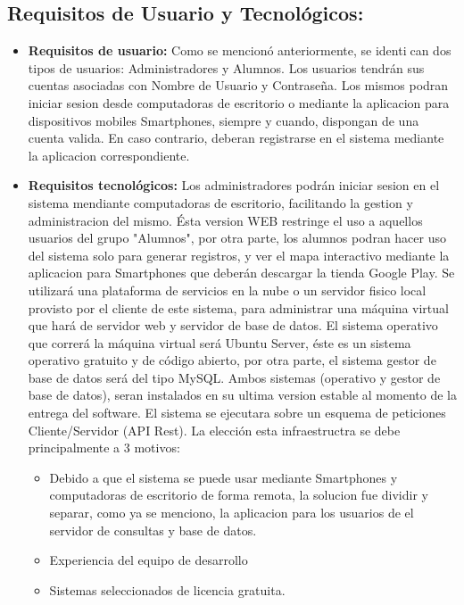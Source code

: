    \subsection{Requisitos de Usuario y Tecnológicos:}
      \begin{itemize}
        \item \textbf{Requisitos de usuario:} Como se mencionó anteriormente, se identican dos tipos de usuarios: Administradores y Alumnos. Los usuarios tendrán sus cuentas asociadas con Nombre de Usuario y Contraseña. Los mismos podran iniciar sesion desde computadoras de escritorio o mediante la aplicacion para dispositivos mobiles Smartphones, siempre y cuando, dispongan de una cuenta valida. En caso contrario, deberan registrarse en el sistema mediante la aplicacion correspondiente.

        \item \textbf{Requisitos tecnológicos:} Los administradores podrán iniciar sesion en el sistema mendiante computadoras de escritorio, facilitando la gestion y administracion del mismo. Ésta version WEB restringe el uso a aquellos usuarios del grupo "Alumnos", por otra parte, los alumnos podran hacer uso del sistema solo para generar registros, y ver el mapa interactivo mediante la aplicacion para Smartphones que deberán descargar la tienda Google Play.
        Se utilizará una plataforma de servicios en la nube o un servidor fisico local provisto por el cliente de este sistema, para administrar una máquina virtual que hará de servidor web y servidor de base de datos. El sistema operativo que correrá la máquina virtual será Ubuntu Server, éste es un sistema operativo gratuito y de código abierto, por otra parte, el sistema gestor de base de datos será del tipo MySQL. Ambos sistemas (operativo y gestor de base de datos), seran instalados en su ultima version estable al momento de la entrega del software.
        El sistema se ejecutara sobre un esquema de peticiones Cliente/Servidor (API Rest). La elección esta infraestructra se debe principalmente a 3 motivos: 
        \begin{itemize}
          \item Debido a que el sistema se puede usar mediante Smartphones y computadoras de escritorio de forma remota, la solucion fue dividir y separar, como ya se menciono, la aplicacion para los usuarios de el servidor de consultas y base de datos.
          \item Experiencia del equipo de desarrollo 
          \item Sistemas seleccionados de licencia gratuita.
        \end{itemize}
      \end{itemize}

